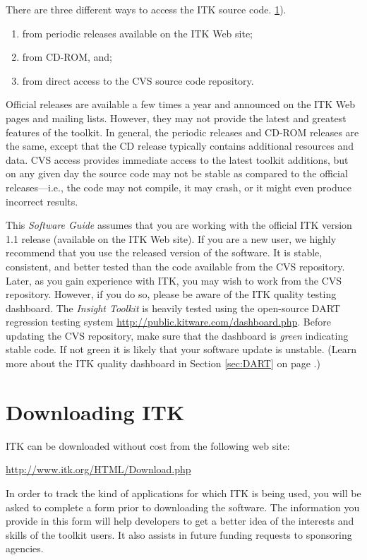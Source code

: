 There are three different ways to access the ITK source code.
\ref{sec:DownloadingITK}).
\begin{enumerate}
	\item	from periodic releases available on the ITK Web site;
	\item	from CD-ROM, and;
	\item	from direct access to the CVS source code repository.
\end{enumerate}
Official releases are available a few times a year and announced on the ITK
Web pages and mailing lists. However, they may not provide the latest and
greatest features of the toolkit. In general, the periodic releases and
CD-ROM releases are the same, except that the CD release typically contains
additional resources and data. CVS access provides immediate access to the
latest toolkit additions, but on any given day the source code may not be
stable as compared to the official releases---i.e., the code may not compile,
it may crash, or it might even produce incorrect results.

This \emph{Software Guide} assumes that you are working with the official ITK
version 1.1 release (available on the ITK Web site). If you are a new user,
we highly recommend that you use the released version of the software. It is
stable, consistent, and better tested than the code available from the CVS
repository. Later, as you gain experience with ITK, you may wish to work from
the CVS repository. However, if you do so, please be aware
of the ITK quality testing dashboard. The \emph{Insight Toolkit} is heavily
tested using the open-source DART regression testing system
\url{http://public.kitware.com/dashboard.php}. Before updating the CVS
repository, make sure that the dashboard is \emph{green} indicating stable
code. If not green it is likely that your software update is unstable. (Learn
more about the ITK quality dashboard in Section
\ref{sec:DART} on page \pageref{sec:DART}.)

\section{Downloading ITK}
\label{sec:DownloadingITK}
 

ITK can be downloaded without cost from the following web site:
\begin{center} 
  \url{http://www.itk.org/HTML/Download.php}
\end{center}
In order to track the kind of applications for which ITK is being used, you
will be asked to complete a form prior to downloading the software.
The information you provide in this form will help developers to get a better
idea of the interests and skills of the toolkit users. It also assists in 
future funding requests to sponsoring agencies.

